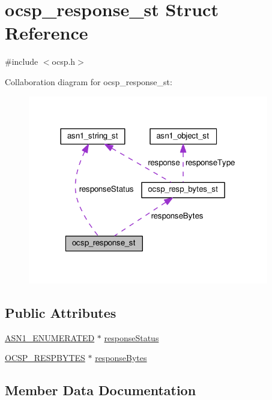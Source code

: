 \hypertarget{structocsp__response__st}{}\section{ocsp\+\_\+response\+\_\+st Struct Reference}
\label{structocsp__response__st}


{\ttfamily \#include $<$ocsp.\+h$>$}



Collaboration diagram for ocsp\+\_\+response\+\_\+st\+:
\nopagebreak
\begin{figure}[H]
\begin{center}
\leavevmode
\includegraphics[width=298pt]{structocsp__response__st__coll__graph}
\end{center}
\end{figure}
\subsection*{Public Attributes}
\begin{DoxyCompactItemize}
\item 
\hyperlink{ossl__typ_8h_a4b87b1c33899eb49377f298e8a8b9850}{A\+S\+N1\+\_\+\+E\+N\+U\+M\+E\+R\+A\+T\+ED} $\ast$ \hyperlink{structocsp__response__st_a5c79d6dd4c93fb0946fc1e94467589fe}{response\+Status}
\item 
\hyperlink{ocsp_8h_a46460429b9fa827a0e5529227acbcd22}{O\+C\+S\+P\+\_\+\+R\+E\+S\+P\+B\+Y\+T\+ES} $\ast$ \hyperlink{structocsp__response__st_a4724a80cc511a45789534e55588e5b9c}{response\+Bytes}
\end{DoxyCompactItemize}


\subsection{Member Data Documentation}
